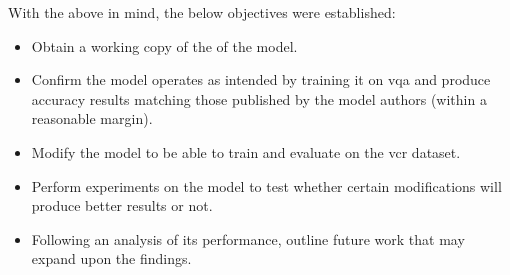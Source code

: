 
With the above in mind, the below objectives were established:

\begin{itemize}\label{list:list_of_objectives}
    \item Obtain a working copy of the of the model.
    \item Confirm the model operates as intended by training it on \gls{vqa} and produce accuracy results matching those published by the model authors (within a reasonable margin).
    \item Modify the model to be able to train and evaluate on the \gls{vcr} dataset.
    \item Perform experiments on the model to test whether certain modifications will produce better results or not.
    \item Following an analysis of its performance, outline future work that may expand upon the findings.
\end{itemize}
